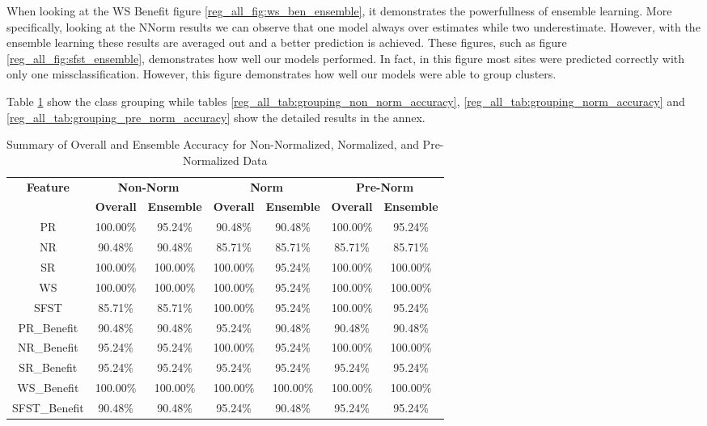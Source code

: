 \documentclass[12pt,letterpaper]{article}
\begin{document}
When looking at the \ac{WS} Benefit figure \ref{reg_all_fig:ws_ben_ensemble}, it demonstrates the powerfullness of ensemble learning.
More specifically, looking at the NNorm results we can observe that one model always over estimates while two underestimate.
However, with the ensemble learning these results are averaged out and a better prediction is achieved.
These figures, such as figure \ref{reg_all_fig:sfst_ensemble}, demonstrates how well our models performed.
In fact, in this figure most sites were predicted correctly with only one missclassification.
However, this figure demonstrates how well our models were able to group clusters.



Table \ref{reg_all_tab:summary_class_grouping} show the class grouping while tables \ref{reg_all_tab:grouping_non_norm_accuracy}, \ref{reg_all_tab:grouping_norm_accuracy} and \ref{reg_all_tab:grouping_pre_norm_accuracy} show the detailed results in the annex.


\begin{table}[H]
\centering
\begin{tabular}{|c||c|c||c|c||c|c|}
\hline
\multirow{2}{*}{\textbf{Feature}} & \multicolumn{2}{c||}{\textbf{Non-Norm}} & \multicolumn{2}{c||}{\textbf{Norm}} & \multicolumn{2}{c|}{\textbf{Pre-Norm}} \\
\cline{2-7}
 & \textbf{Overall} & \textbf{Ensemble} & \textbf{Overall} & \textbf{Ensemble} & \textbf{Overall} & \textbf{Ensemble} \\
\hline
PR & 100.00\% & 95.24\% & 90.48\% & 90.48\% & 100.00\% & 95.24\% \\
\hline
NR & 90.48\% & 90.48\% & 85.71\% & 85.71\% & 85.71\% & 85.71\% \\
\hline
SR & 100.00\% & 100.00\% & 100.00\% & 95.24\% & 100.00\% & 100.00\%\\
\hline
WS & 100.00\% & 100.00\% & 100.00\% & 95.24\% & 100.00\% & 100.00\% \\
\hline
SFST & 85.71\% & 85.71\% & 100.00\% & 95.24\% & 100.00\% & 95.24\% \\
\hline
PR\_Benefit & 90.48\% & 90.48\% & 95.24\% & 90.48\% & 90.48\% & 90.48\% \\
\hline
NR\_Benefit & 95.24\% & 95.24\% & 100.00\% & 95.24\% & 100.00\% & 100.00\% \\
\hline
SR\_Benefit & 95.24\% & 95.24\% & 95.24\% & 95.24\% & 95.24\% & 95.24\% \\
\hline
WS\_Benefit & 100.00\% & 100.00\% & 100.00\% & 100.00\% & 100.00\% & 100.00\% \\
\hline
SFST\_Benefit & 90.48\% & 90.48\% & 95.24\% & 90.48\% & 95.24\% & 95.24\% \\
\hline
\end{tabular}
\caption{Summary of Overall and Ensemble Accuracy for Non-Normalized, Normalized, and Pre-Normalized Data}
\label{reg_all_tab:summary_class_grouping}
\end{table}
\end{document}
